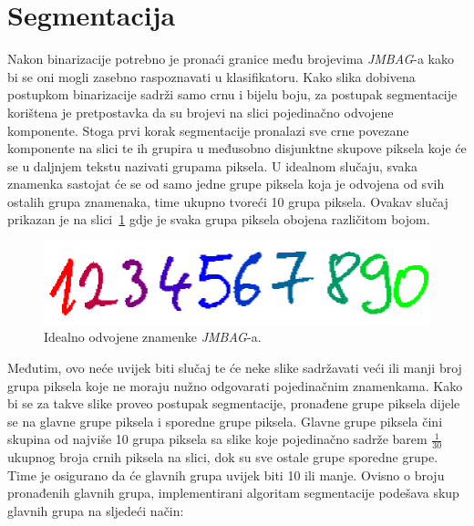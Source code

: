 \section{Segmentacija}
\label{sec:segmentacija}
Nakon binarizacije potrebno je pronaći granice među brojevima \emph{JMBAG}-a kako bi se oni mogli zasebno raspoznavati
u klasifikatoru. Kako slika dobivena postupkom binarizacije sadrži samo crnu i bijelu boju, za postupak segmentacije
korištena je pretpostavka da su brojevi na slici pojedinačno odvojene komponente. Stoga prvi korak segmentacije
pronalazi sve crne povezane komponente na slici te ih grupira u međusobno disjunktne skupove piksela koje će se u
daljnjem tekstu nazivati grupama piksela. U idealnom slučaju, svaka znamenka sastojat će se od samo jedne grupe piksela
koja je odvojena od svih ostalih grupa znamenaka, time ukupno tvoreći 10 grupa piksela. Ovakav slučaj prikazan je na
slici\ \ref{fig:ideal-segmentation} gdje je svaka grupa piksela obojena različitom bojom.
\begin{figure}[htb]
    \centering
    \includegraphics[width=12cm]{images/ideal-segmentation.png}
    \caption{Idealno odvojene znamenke \emph{JMBAG}-a.}
    \label{fig:ideal-segmentation}
\end{figure}
Međutim, ovo neće uvijek biti slučaj te će neke slike sadržavati veći ili manji broj grupa piksela koje ne moraju nužno
odgovarati pojedinačnim znamenkama. Kako bi se za takve slike proveo postupak segmentacije, pronađene grupe piksela
dijele se na glavne grupe piksela i sporedne grupe piksela. Glavne grupe piksela čini skupina od najviše 10 grupa
piksela sa slike koje pojedinačno sadrže barem $\frac{1}{30}$ ukupnog broja crnih piksela na slici, dok su sve ostale
grupe sporedne grupe. Time je osigurano da će glavnih grupa uvijek biti 10 ili manje. Ovisno o broju pronađenih glavnih
grupa, implementirani algoritam segmentacije podešava skup glavnih grupa na sljedeći način:
